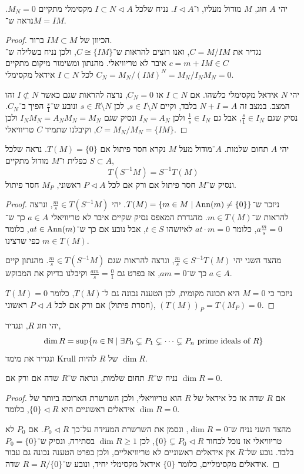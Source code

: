 \question{}
יהי $A$ חוג, $M$ מודול מעליו, ו־$I \triangleleft A$.
נניח שלכל $I \subset N \triangleleft A$ מקסימלי מתקיים $M_N = 0$.
נראה ש־$M = I M$.
\begin{proof}
	הכיוון של $I M \subset M$ ברור. \\
	נגדיר את $C = M / I M$, ואנו רוצים להראות ש־$C \cong \{ I M \}$, ולכן נניח בשלילה ש־$c = m + I M \in C$ איבר לא טריוויאלי.
	מהנתון ומשימור מיקום מתקיים $C_N = M_N / {(I M)}^N = M_N / I_N M_N = 0$ לכל $I \subset N$ אידאל מקסימלי.

	יהי $N$ אידאל מקסימלי כלשהו. אם $I \subset N$ אז $C_N = 0$, נרצה להראות שגם כאשר $I \not\subset N$ זהו המצב.
	במצב זה $N + I = A$ בלבד, וקיים $s \in I \setminus N$, לכן $s \in R \setminus N$ ונובע ש־$\frac{s}{1}$ הפיך ב־$C_N$.
	נסיק שגם $\frac{s}{1} \in I_N$, אבל גם $\frac{1}{s} \in I_N$ ולכן $I_N = A_N$ ונסיק שגם $I_N M_N = A_N M_N = M_N$ ולכן $C = M_N / M_N = \{ I M \}$, וקיבלנו שתמיד $C$ טריוויאלי.
\end{proof}

\question{}
יהי $A$ תחום שלמות.
$A$־מודול מעל $M$ נקרא חסר פיתול אם $T(M) = \{ 0 \}$.
נראה שלכל $S \subset A$ כפלית ו־$M$ מודול מתקיים,
\[
	T(S^{-1} M)
	= S^{-1} T(M)
\]
ונסיק ש־$M$ חסר פיתול אם ורק אם לכל $P \triangleleft A$ ראשוני, $M_P$ חסר פיתול.
\begin{proof}
	ניזכר ש־$T(M) = \{ m \in M \mid \operatorname{Ann}(m) \ne \{ 0 \} \}$.
	יהי $\frac{m}{s} \in T(S^{-1} M)$, ונרצה להראות ש־$m \in T(M)$.
	מהגדרת המאפס נסיק שקיים איבר לא טריוויאלי $a \in A$ כך ש־$a \frac{m}{s} = 0$, כלומר $a t \cdot m = 0$ לאיזשהו $t \in S$, אבל נובע אם כך ש־$a t \in \operatorname{Ann}(m)$, כלומר $m \in T(M)$ כפי שרצינו.

	מהצד השני יהי $\frac{m}{s} \in S^{-1} T(M)$, ונרצה להראות שגם $\frac{m}{s} \in T(S^{-1} M)$.
	מהנתון קיים $a \in A$ כך ש־$a m = 0$, אז בפרט גם $\frac{a m}{s} = \frac{0}{1}$ וקיבלנו בדיוק את המבוקש.

	ניזכר כי $M = 0$ היא תכונה מקומית, לכן הטענה נכונה גם ל־$T(M)$, כלומר $T(M) = 0$ (חסרת פיתול) אם ורק אם לכל $P \triangleleft A$ ראשוני, ${(T(M))}_P = T(M_P) = 0$.
\end{proof}

\question{}
יהי חוג $R$, ונגדיר,
\[
	\dim R
	= \sup\{ n \in \mathbb{N} \mid \exists P_0 \subsetneq P_1 \subsetneq \cdots \subsetneq P_n \text{ prime ideals of } R \}
\]
ונגדיר את מימד Krull של $R$ להיות $\dim R$.

\subquestion{}
נניח ש־$R$ תחום שלמות, ונראה ש־$R$ שדה אם ורק אם $\dim R = 0$.
\begin{proof}
	אם $R$ שדה אז כל אידאל של $R$ הוא טריוויאלי, ולכן השרשרת הארוכה ביותר של אידאלים ראשוניים היא $\{ 0 \} \triangleleft R$, כלומר $\dim R = 0$.

	מהצד השני נניח ש־$\dim R = 0$, ונסמן את השרשרת המעידה על־כך $P_0 \triangleleft R$.
	אם $P_0$ לא טריוויאלי אז נוכל לבחור $\{ 0 \} \subsetneq P_0 \triangleleft R$, לכן $\dim R \ge 1$ בסתירה, ונסיק ש־$P_0 = \{ 0 \}$ בלבד.
	נובע של־$R$ אין אידאלים ראשוניים לא טריוויאליים, ולכן בפרט הטענה נכונה גם עבור אידאלים מקסימליים, כלומר $\{ 0 \}$ אידאל מקסימלי יחיד, ונובע ש־$R = R / \{ 0 \}$ שדה.
\end{proof}


